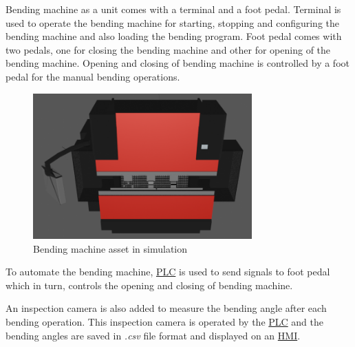
Bending machine as a unit comes with a terminal and a foot pedal. Terminal is used to operate
the bending machine for starting, stopping and configuring the bending machine and also loading the bending program.
Foot pedal comes with two pedals, one for closing the bending machine and other for opening of the bending machine.
Opening and closing of bending machine is controlled by a foot pedal for the manual bending operations.

\begin{figure}[h]
    \centering
    \includegraphics[width=0.75\textwidth]{figures/bending-machine-blender.png}
    \caption{Bending machine asset in simulation}
    \label{fig:bending-machine-blender}
\end{figure}
To automate the bending machine, \hyperref[acro:PLC]{PLC} is used to send signals to foot pedal which in turn, controls the opening and closing of bending machine.

An inspection camera is also added to measure the bending angle after each bending operation. This inspection camera is operated by the \hyperref[acro:PLC]{PLC}
and the bending angles are saved in \textit{.csv} file format and displayed on an \hyperref[acro:HMI]{HMI}.
